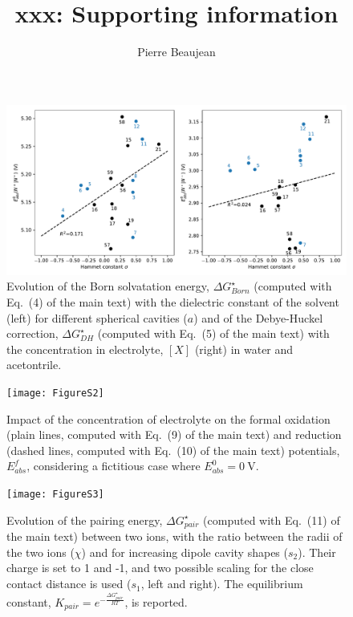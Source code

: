\documentclass[11pt,a4paper]{article}
\title{xxx: Supporting information}
\author{Pierre Beaujean}
\begin{document}
\maketitle


\renewcommand{\thetable}{S\arabic{table}}
\renewcommand{\thefigure}{S\arabic{figure}}

\begin{figure}[!h]
	\centering
	\includegraphics [width=\linewidth]{FigureS1}
	\caption{Evolution of the Born solvatation energy, $\Delta G^\star_{Born}$ (computed with Eq.~(4) of the main text) with the dielectric constant of the solvent (left) for different spherical cavities ($a$) and of the Debye-Huckel correction, $\Delta G^\star_{DH}$  (computed with Eq.~(5) of the main text) with the concentration in electrolyte, $[X]$ (right) in water and acetontrile.}
\end{figure}

\begin{figure}[!h]
\centering
\texttt{[image: FigureS2]}
\caption{Impact of the concentration of electrolyte on the formal oxidation (plain lines, computed with Eq.~(9) of the main text) and reduction (dashed lines, computed with Eq.~(10) of the main text) potentials, $E^f_{abs}$, considering a fictitious case where $E^0_{abs} = \SI{0}{\volt}$.}
\end{figure}

\begin{figure}[!h]
\centering
\texttt{[image: FigureS3]}
\caption{Evolution of the pairing energy, $\Delta G^\star_{pair}$ (computed with Eq.~(11) of the main text) between two ions, with the ratio between the radii of the two ions ($\chi$) and for increasing dipole cavity shapes ($s_2$). Their charge is set to 1 and -1, and two possible scaling for  the close contact distance is used ($s_1$, left and right). The equilibrium constant, $K_{pair} = e^{-\frac{\Delta G^\star_{pair}}{RT}}$, is reported. }
\end{figure}
\end{document}
